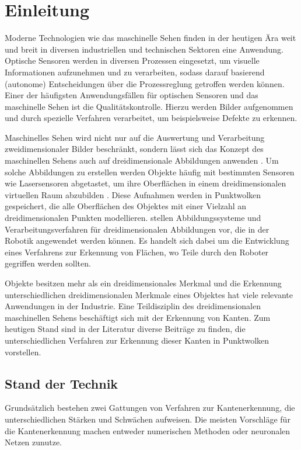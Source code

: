 \chapter{Einleitung}
Moderne Technologien wie das maschinelle Sehen finden in der heutigen Ära weit und breit in diversen industriellen und technischen Sektoren eine Anwendung. Optische Sensoren werden in diversen Prozessen eingesetzt, um visuelle Informationen aufzunehmen und zu verarbeiten, sodass darauf basierend (autonome) Entscheidungen über die Prozessreglung getroffen werden können. Einer der häufigsten Anwendungsfällen für optischen Sensoren und das maschinelle Sehen ist die Qualitätskontrolle. Hierzu werden Bilder aufgenommen und durch spezielle Verfahren verarbeitet, um beispielsweise Defekte zu erkennen. \autocite[3-11]{beyerer_machine_2015}

Maschinelles Sehen wird nicht nur auf die Auswertung und Verarbeitung zweidimensionaler Bilder beschränkt, sondern lässt sich das Konzept des maschinellen Sehens auch auf dreidimensionale Abbildungen anwenden \autocite{biegelbauer_model-based_2010}. Um solche Abbildungen zu erstellen werden Objekte häufig mit bestimmten Sensoren wie Lasersensoren abgetastet, um ihre Oberflächen in einem dreidimensionalen virtuellen Raum abzubilden \autocite[20-22]{savla_intelligente_2022}. Diese Aufnahmen werden in Punktwolken gespeichert, die alle Oberflächen des Objektes mit einer Vielzahl an dreidimensionalen Punkten modellieren. \Textcite{lougheed_3-d_1988} stellen Abbildungssysteme und Verarbeitungsverfahren für dreidimensionalen Abbildungen vor, die in der Robotik angewendet werden können. Es handelt sich dabei um die Entwicklung eines Verfahrens zur Erkennung von Flächen, wo Teile durch den Roboter gegriffen werden sollten. 

Objekte besitzen mehr als ein dreidimensionales Merkmal und die Erkennung unterschiedlichen dreidimensionalen Merkmale eines Objektes hat viele relevante Anwendungen in der Industrie. Eine Teildisziplin des dreidimensionalen maschinellen Sehens beschäftigt sich mit der Erkennung von Kanten. Zum heutigen Stand sind in der Literatur diverse Beiträge zu finden, die unterschiedlichen Verfahren zur Erkennung dieser Kanten in Punktwolken vorstellen.

\section{Stand der Technik} \label{Stand_der_Technik}
Grundsätzlich bestehen zwei Gattungen von Verfahren zur Kantenerkennung, die unterschiedlichen Stärken und Schwächen aufweisen. Die meisten Vorschläge für die Kantenerkennung machen entweder numerischen Methoden oder neuronalen Netzen zunutze.

